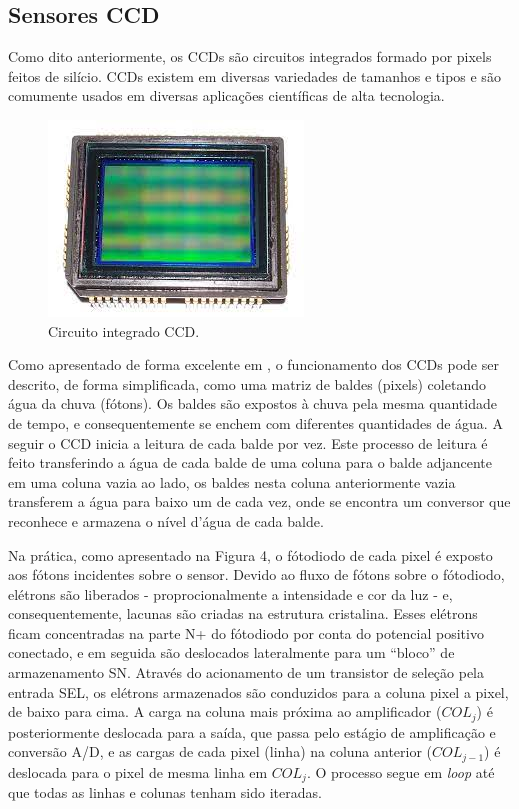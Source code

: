 \documentclass[11pt,a4paper,twocolumn]{article}
\begin{document}
	\subsection*{Sensores CCD}
	Como dito anteriormente, os CCDs são circuitos integrados formado por pixels feitos de silício. CCDs existem em diversas variedades de tamanhos e tipos e são comumente usados em diversas aplicações científicas de alta tecnologia.
	
	\begin{figure}[!h]
		\centering
		\includegraphics[scale=0.4]{imagens/ccd.jpg}
		\caption{Circuito integrado CCD.}
	\end{figure}
		
	Como apresentado de forma excelente em \cite{Spectral}, o funcionamento dos CCDs pode ser descrito, de forma simplificada, como uma matriz de baldes (pixels) coletando água da chuva (fótons). Os baldes são expostos à chuva pela mesma quantidade de tempo, e consequentemente se enchem com diferentes quantidades de água. A seguir o CCD inicia a leitura de cada balde por vez. Este processo de leitura é feito transferindo a água de cada balde de uma coluna para o balde adjancente em uma coluna vazia ao lado, os baldes nesta coluna anteriormente vazia transferem a água para baixo um de cada vez, onde se encontra um conversor que reconhece e armazena o nível d'água de cada balde.
	
	Na prática, como apresentado na Figura 4, o fótodiodo de cada pixel é exposto aos fótons incidentes sobre o sensor. Devido ao fluxo de fótons sobre o fótodiodo, elétrons são liberados - proprocionalmente a intensidade e cor da luz - e, consequentemente, lacunas são criadas na estrutura cristalina. Esses elétrons ficam concentradas na parte N+ do fótodiodo por conta do potencial positivo conectado, e em seguida são deslocados lateralmente para um ``bloco'' de armazenamento SN. Através do acionamento de um transistor de seleção pela entrada SEL, os elétrons armazenados são conduzidos para a coluna pixel a pixel, de baixo para cima. A carga na coluna mais próxima ao amplificador ($COL_{j}$) é posteriormente deslocada para a saída, que passa pelo estágio de amplificação e conversão A/D, e as cargas de cada pixel (linha) na coluna anterior ($COL_{j-1}$) é deslocada para o pixel de mesma linha em $COL_{j}$. O processo segue em \textit{loop} até que todas as linhas e colunas tenham sido iteradas.
	
\end{document}

